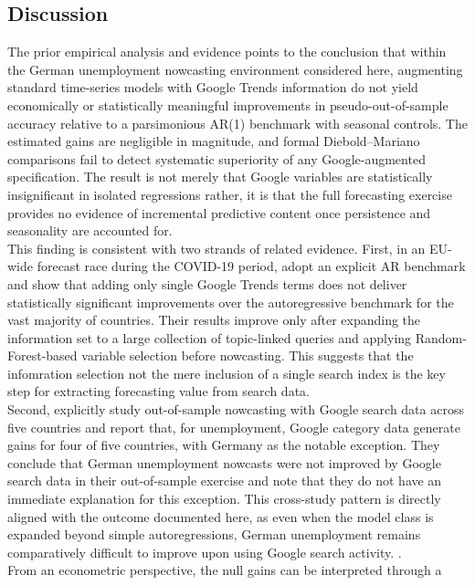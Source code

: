 \documentclass[12pt,a4paper]{article}
\begin{document}
\subsection{Discussion}
The prior empirical analysis and evidence points to the conclusion that within the German
unemployment nowcasting environment considered here, augmenting standard
time-series models with Google Trends information do not yield economically or statistically meaningful improvements
in pseudo-out-of-sample accuracy relative to a parsimonious AR(1) benchmark
with seasonal controls.
The estimated gains are negligible in magnitude, and
formal Diebold--Mariano comparisons fail to detect systematic superiority of any
Google-augmented specification. The result is not merely that Google variables
are statistically insignificant in isolated regressions rather, it is that the full forecasting
exercise provides no evidence of incremental predictive content once persistence
and seasonality are accounted for.\\
This finding is consistent with two strands of related evidence. First, in an EU-wide
forecast race during the COVID-19 period, \citet{caperna2020googling} adopt an explicit AR
benchmark and show that adding only single Google Trends terms does not deliver statistically significant improvements
over the autoregressive benchmark for the vast majority of countries. Their results
improve only after expanding the information set to a large collection of topic-linked
queries and applying Random-Forest-based variable selection before
nowcasting. This suggests that the infomration selection not the mere inclusion of a single search index is the key step for
extracting forecasting value from search data. \\
Second, \citet{niesert2020can} explicitly study out-of-sample nowcasting with Google search
data across five countries and report that, for unemployment, Google category data
generate gains for four of five countries, with Germany as the notable
exception. They conclude that German unemployment nowcasts were not improved
by Google search data in their out-of-sample exercise and note that they do not have
an immediate explanation for this exception. This cross-study pattern is directly
aligned with the outcome documented here, as even when the model class is expanded
beyond simple autoregressions, German unemployment remains comparatively difficult to improve
upon using Google search activity. \citep{niesert2020can}.\\
From an econometric perspective, the null gains can be interpreted through a
\end{document}
